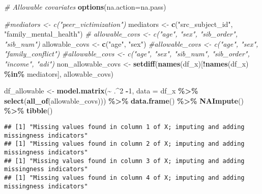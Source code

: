 \documentclass[
]{article}
\newenvironment{Shaded}{\begin{snugshade}}{\end{snugshade}}
\newcommand{\AttributeTok}[1]{\textcolor[rgb]{0.13,0.29,0.53}{#1}}
\newcommand{\CommentTok}[1]{\textcolor[rgb]{0.56,0.35,0.01}{\textit{#1}}}
\newcommand{\DecValTok}[1]{\textcolor[rgb]{0.00,0.00,0.81}{#1}}
\newcommand{\FunctionTok}[1]{\textcolor[rgb]{0.13,0.29,0.53}{\textbf{#1}}}
\newcommand{\NormalTok}[1]{#1}
\newcommand{\OtherTok}[1]{\textcolor[rgb]{0.56,0.35,0.01}{#1}}
\newcommand{\SpecialCharTok}[1]{\textcolor[rgb]{0.81,0.36,0.00}{\textbf{#1}}}
\newcommand{\StringTok}[1]{\textcolor[rgb]{0.31,0.60,0.02}{#1}}
\begin{document}
\begin{Shaded}
\begin{Highlighting}[]
\CommentTok{\# Allowable covariates }
\FunctionTok{options}\NormalTok{(}\AttributeTok{na.action=}\StringTok{\textquotesingle{}na.pass\textquotesingle{}}\NormalTok{)}


\CommentTok{\#mediators \textless{}{-} c("peer\_victimization")}
\NormalTok{mediators }\OtherTok{\textless{}{-}} \FunctionTok{c}\NormalTok{(}\StringTok{"src\_subject\_id"}\NormalTok{, }\StringTok{"family\_mental\_health"}\NormalTok{)}
\CommentTok{\# allowable\_covs \textless{}{-} c("age", "sex", "sib\_order", "sib\_num")}
\NormalTok{allowable\_covs }\OtherTok{\textless{}{-}} \FunctionTok{c}\NormalTok{(}\StringTok{"age"}\NormalTok{, }\StringTok{"sex"}\NormalTok{)}
\CommentTok{\#allowable\_covs \textless{}{-} c("age", "sex", "family\_conflict")}
\CommentTok{\#allowable\_covs \textless{}{-} c("age", "sex", "sib\_num", "sib\_order", "income", "adi")}
\NormalTok{non\_allowable\_covs }\OtherTok{\textless{}{-}} \FunctionTok{setdiff}\NormalTok{(}\FunctionTok{names}\NormalTok{(df\_x)[}\SpecialCharTok{!}\FunctionTok{names}\NormalTok{(df\_x) }\SpecialCharTok{\%in\%}\NormalTok{ mediators], allowable\_covs)}

\NormalTok{df\_allowable }\OtherTok{\textless{}{-}} \FunctionTok{model.matrix}\NormalTok{(}\SpecialCharTok{\textasciitilde{}}\NormalTok{ .}\SpecialCharTok{\^{}}\DecValTok{2} \SpecialCharTok{{-}}\DecValTok{1}\NormalTok{, }\AttributeTok{data =}\NormalTok{ df\_x }\SpecialCharTok{\%\textgreater{}\%} \FunctionTok{select}\NormalTok{(}\FunctionTok{all\_of}\NormalTok{(allowable\_covs))) }\SpecialCharTok{\%\textgreater{}\%} 
  \FunctionTok{data.frame}\NormalTok{() }\SpecialCharTok{\%\textgreater{}\%} \FunctionTok{NAImpute}\NormalTok{() }\SpecialCharTok{\%\textgreater{}\%} \FunctionTok{tibble}\NormalTok{()}
\end{Highlighting}
\end{Shaded}

\begin{verbatim}
## [1] "Missing values found in column 1 of X; imputing and adding missingness indicators"
## [1] "Missing values found in column 2 of X; imputing and adding missingness indicators"
## [1] "Missing values found in column 3 of X; imputing and adding missingness indicators"
## [1] "Missing values found in column 4 of X; imputing and adding missingness indicators"
\end{verbatim}
\end{document}
